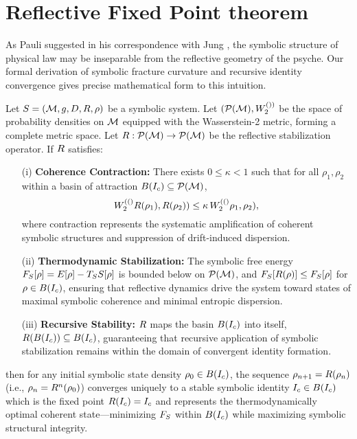\section{Reflective Fixed Point theorem}
\label{sec:bk7_reflective_fixed_point_theorem}
As Pauli suggested in his correspondence with Jung \cite{pauli1994atom}, the symbolic structure of physical law may be inseparable from the reflective geometry of the psyche. Our formal derivation of symbolic fracture curvature and recursive identity convergence gives precise mathematical form to this intuition.
\begin{theorem}
\label{theorem:bk7_reflective_convergence_to_stable_identity}
Let $S = (\mathcal{M}, g, D, R, \rho)$ be a symbolic system. Let $(\mathcal{P}(\mathcal{M}), W_2^{())}$ be the space of probability densities on $\mathcal{M}$ equipped with the Wasserstein-2 metric, forming a complete metric space. Let $R : \mathcal{P}(\mathcal{M}) \to \mathcal{P}(\mathcal{M})$ be the reflective stabilization operator. If $R$ satisfies:
\begin{itemize}
    \item[(i)] \textbf{Coherence Contraction:} There exists $0 \le \kappa < 1$ such that for all $\rho_1, \rho_2$ within a basin of attraction $B(I_c) \subseteq \mathcal{P}(\mathcal{M})$,
    \[
    W_2^{(()}R(\rho_1), R(\rho_2)) \leq \kappa \, W_2^{(()}\rho_1, \rho_2),
    \]
    where contraction represents the systematic amplification of coherent symbolic structures and suppression of drift-induced dispersion.
    \item[(ii)] \textbf{Thermodynamic Stabilization:} The symbolic free energy $F_S[\rho] = E[\rho] - T_S S[\rho]$ is bounded below on $\mathcal{P}(\mathcal{M})$, and $F_S[R(\rho)] \le F_S[\rho]$ for $\rho \in B(I_c)$, ensuring that reflective dynamics drive the system toward states of maximal symbolic coherence and minimal entropic dispersion.
    \item[(iii)] \textbf{Recursive Stability:} $R$ maps the basin $B(I_c)$ into itself, $R(B(I_c)) \subseteq B(I_c)$, guaranteeing that recursive application of symbolic stabilization remains within the domain of convergent identity formation.
\end{itemize}
then for any initial symbolic state density $\rho_0 \in B(I_c)$, the sequence $\rho_{n+1} = R(\rho_n)$ (i.e., $\rho_n = R^n(\rho_0)$) converges uniquely to a stable symbolic identity $I_c \in B(I_c)$ which is the fixed point $R(I_c) = I_c$ and represents the thermodynamically optimal coherent state—minimizing $F_S$ within $B(I_c)$ while maximizing symbolic structural integrity.
\end{theorem}

